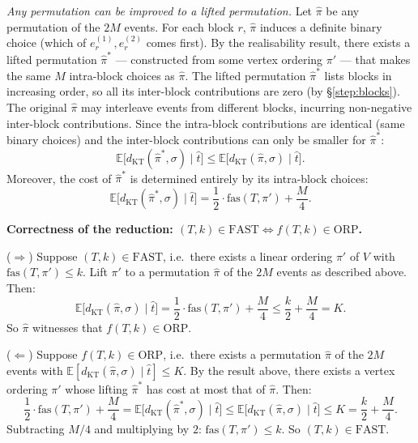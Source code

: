 \documentclass[11pt]{article}
\begin{document}
\smallskip
\noindent\emph{Any permutation can be improved to a lifted permutation.}
Let $\hat{\pi}$ be any permutation of the $2M$ events. For each block $r$, $\hat{\pi}$ induces a definite binary choice (which of $e_r^{(1)}, e_r^{(2)}$ comes first). By the realisability result, there exists a lifted permutation $\hat{\pi}^*$ --- constructed from some vertex ordering $\pi'$ --- that makes the same $M$ intra-block choices as $\hat{\pi}$. The lifted permutation $\hat{\pi}^*$ lists blocks in increasing order, so all its inter-block contributions are zero (by \S\ref{step:blocks}). The original $\hat{\pi}$ may interleave events from different blocks, incurring non-negative inter-block contributions. Since the intra-block contributions are identical (same binary choices) and the inter-block contributions can only be smaller for $\hat{\pi}^*$:
\begin{equation}
\mathbb{E}\bigl[d_{\mathrm{KT}}(\hat{\pi}^*, \sigma) \mid \hat{t}\bigr] \le \mathbb{E}\bigl[d_{\mathrm{KT}}(\hat{\pi}, \sigma) \mid \hat{t}\bigr].
\end{equation}
Moreover, the cost of $\hat{\pi}^*$ is determined entirely by its intra-block choices:
\begin{equation}
\mathbb{E}\bigl[d_{\mathrm{KT}}(\hat{\pi}^*, \sigma) \mid \hat{t}\bigr] = \frac{1}{2} \cdot \mathrm{fas}(T, \pi') + \frac{M}{4}.
\end{equation}

\smallskip
\noindent\textbf{Correctness of the reduction: $(T, k) \in \mathrm{FAST} \iff f(T, k) \in \mathrm{ORP}$.}

\smallskip
\noindent ($\Rightarrow$)\; Suppose $(T, k) \in \mathrm{FAST}$, i.e.\ there exists a linear ordering $\pi'$ of $V$ with $\mathrm{fas}(T, \pi') \le k$. Lift $\pi'$ to a permutation $\hat{\pi}$ of the $2M$ events as described above. Then:
\begin{equation}
\mathbb{E}\bigl[d_{\mathrm{KT}}(\hat{\pi}, \sigma) \mid \hat{t}\bigr] = \frac{1}{2} \cdot \mathrm{fas}(T, \pi') + \frac{M}{4} \le \frac{k}{2} + \frac{M}{4} = K.
\end{equation}
So $\hat{\pi}$ witnesses that $f(T, k) \in \mathrm{ORP}$.

\smallskip
\noindent ($\Leftarrow$)\; Suppose $f(T, k) \in \mathrm{ORP}$, i.e.\ there exists a permutation $\hat{\pi}$ of the $2M$ events with $\mathbb{E}[d_{\mathrm{KT}}(\hat{\pi}, \sigma) \mid \hat{t}] \le K$. By the result above, there exists a vertex ordering $\pi'$ whose lifting $\hat{\pi}^*$ has cost at most that of $\hat{\pi}$. Then:
\begin{equation}
\frac{1}{2} \cdot \mathrm{fas}(T, \pi') + \frac{M}{4} = \mathbb{E}\bigl[d_{\mathrm{KT}}(\hat{\pi}^*, \sigma) \mid \hat{t}\bigr] \le \mathbb{E}\bigl[d_{\mathrm{KT}}(\hat{\pi}, \sigma) \mid \hat{t}\bigr] \le K = \frac{k}{2} + \frac{M}{4}.
\end{equation}
Subtracting $M/4$ and multiplying by $2$: $\mathrm{fas}(T, \pi') \le k$. So $(T, k) \in \mathrm{FAST}$.
\end{document}
